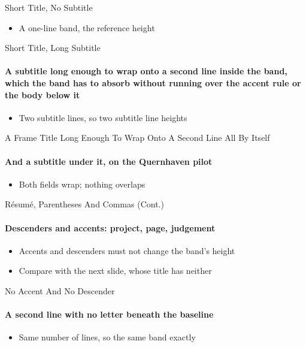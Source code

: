 \documentclass[aspectratio=169]{beamer}
\begin{document}
\begin{frame}{Short Title, No Subtitle}
  \begin{itemize}
    \item A one-line band, the reference height
  \end{itemize}
\end{frame}

\begin{frame}{Short Title, Long Subtitle}
  \framesubtitle{A subtitle long enough to wrap onto a second line inside the
    band, which the band has to absorb without running over the accent rule or
    the body below it}
  \begin{itemize}
    \item Two subtitle lines, so two subtitle line heights
  \end{itemize}
\end{frame}

\begin{frame}{A Frame Title Long Enough To Wrap Onto A Second Line All By Itself}
  \framesubtitle{And a subtitle under it, on the Quernhaven pilot}
  \begin{itemize}
    \item Both fields wrap; nothing overlaps
  \end{itemize}
\end{frame}

{
\begin{frame}{Résumé, Parentheses And Commas (Cont.)}
  \framesubtitle{Descenders and accents: project, page, judgement}
  \begin{itemize}
    \item Accents and descenders must not change the band's height
    \item Compare with the next slide, whose title has neither
  \end{itemize}
\end{frame}

\begin{frame}{No Accent And No Descender}
  \framesubtitle{A second line with no letter beneath the baseline}
  \begin{itemize}
    \item Same number of lines, so the same band exactly
  \end{itemize}
\end{frame}
}

\end{document}
